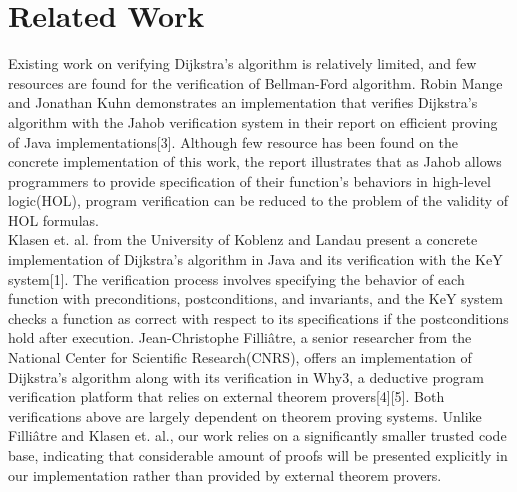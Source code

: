 
\section{Related Work}
Existing work on verifying Dijkstra's algorithm is relatively limited, and few resources are found for the verification of Bellman-Ford algorithm. Robin Mange and Jonathan Kuhn demonstrates an implementation that verifies Dijkstra's algorithm with the Jahob verification system in their report on efficient proving of Java implementations[3]. Although few resource has been found on the concrete implementation of this work, the report illustrates that as Jahob allows programmers to provide specification of their function's behaviors in high-level logic(HOL), program verification can be reduced to the problem of the validity of HOL formulas. 
\\

Klasen et. al. from the University of Koblenz and Landau present a concrete implementation of Dijkstra's algorithm in Java and its verification with the KeY system[1]. The verification process involves specifying the behavior of each function with preconditions, postconditions, and invariants, and the KeY system checks a function as correct with respect to its specifications if the postconditions hold after execution. Jean-Christophe Filliâtre, a senior researcher from the National Center for Scientific Research(CNRS), offers an implementation of Dijkstra's algorithm along with its verification in Why3, a deductive program verification platform that relies on external theorem provers[4][5]. Both verifications above are largely dependent on theorem proving systems. Unlike Filliâtre and Klasen et. al., our work relies on a significantly smaller trusted code base, indicating that considerable amount of proofs will be presented explicitly in our implementation rather than provided by external theorem provers.
